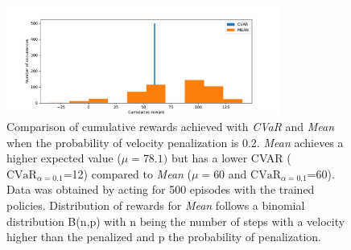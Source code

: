 \begin{figure}[ht]
        \centering
        \includegraphics[width=0.8\textwidth]{images/Car/histogram_rewards1vs01.pdf}
        \caption{Comparison of cumulative rewards achieved with \textit{CVaR} and \textit{Mean}
        when the probability of velocity penalization is 0.2.
        \textit{Mean} achieves a higher expected value  ($\mu=78.1)$  but 
        has a lower CVAR ($\text{CVaR}_{\alpha= 0.1}$=12) compared to
        \textit{Mean} ($\mu=60$ and $\text{CVaR}_{\alpha= 0.1}$=60).
        Data was obtained by acting for 500 episodes with the trained policies.
        Distribution of rewards for \textit{Mean} follows a binomial distribution B(n,p)
        with n being the number of steps with a velocity higher than the penalized and 
        p the probability of penalization.}
        \label{histogram_cvar_vs_mean}
    
\end{figure}



